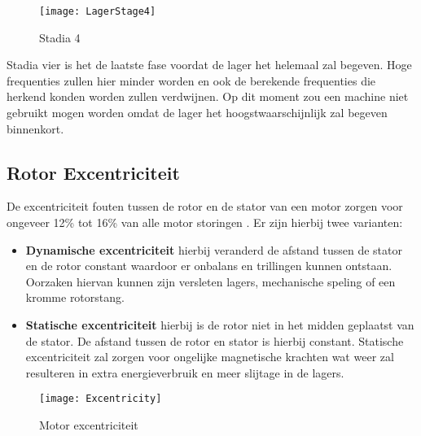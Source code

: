 \begin{figure}[H]
	\centering
	\texttt{[image: LagerStage4]}
	\label{fig:LagerStage4}
	\caption{Stadia 4 \cite{web:BearingFault}}
\end{figure}

Stadia vier is het de laatste fase voordat de lager het helemaal zal begeven. Hoge frequenties zullen hier minder worden en ook de berekende frequenties die herkend konden worden zullen verdwijnen. Op dit moment zou een machine niet gebruikt mogen worden omdat de lager het hoogstwaarschijnlijk zal begeven binnenkort.

\newpage

\subsection{Rotor Excentriciteit}

De excentriciteit fouten tussen de rotor en de stator van een motor zorgen voor ongeveer 12\% tot 16\% van alle motor storingen \cite{MotorExcenttriciteit}. Er zijn hierbij twee varianten:

\begin{itemize}
	\item \textbf{Dynamische excentriciteit} hierbij veranderd de afstand tussen de stator en de rotor constant waardoor er onbalans en trillingen kunnen ontstaan. Oorzaken hiervan kunnen zijn versleten lagers, mechanische speling of een kromme rotorstang.
	
	\item \textbf{Statische excentriciteit} hierbij is de rotor niet in het midden geplaatst van de stator. De afstand tussen de rotor en stator is hierbij constant. Statische excentriciteit zal zorgen voor ongelijke magnetische krachten wat weer zal resulteren in extra energieverbruik en meer slijtage in de lagers.
\end{itemize}

\begin{figure}[H]
	\centering
	\texttt{[image: Excentricity]}
	\label{fig:Excentricity}
	\caption{Motor excentriciteit \cite{staticdynamicexcentricity}}
\end{figure}